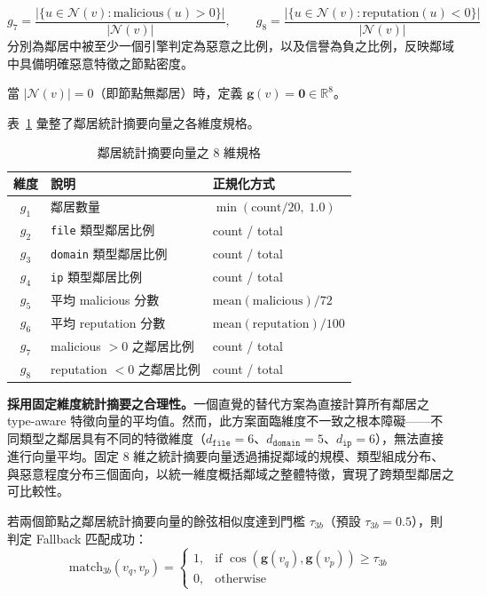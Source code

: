 \begin{ZhChapter}
\begin{equation}
    g_7 = \frac{|\{u \in \mathcal{N}(v) : \text{malicious}(u) > 0\}|}{|\mathcal{N}(v)|}, \qquad g_8 = \frac{|\{u \in \mathcal{N}(v) : \text{reputation}(u) < 0\}|}{|\mathcal{N}(v)|}
    \label{eq:g78}
\end{equation}
分別為鄰居中被至少一個引擎判定為惡意之比例，以及信譽為負之比例，反映鄰域中具備明確惡意特徵之節點密度。

當 $|\mathcal{N}(v)| = 0$（即節點無鄰居）時，定義 $\mathbf{g}(v) = \mathbf{0} \in \mathbb{R}^{8}$。

表~\ref{tab:neighbor-summary} 彙整了鄰居統計摘要向量之各維度規格。

\begin{table}[htbp]
    \centering
    \caption{鄰居統計摘要向量之 8 維規格}
    \label{tab:neighbor-summary}
    \renewcommand\arraystretch{1.2}
    \begin{tabular}{c l l}
        \hline
        \textbf{維度} & \textbf{說明} & \textbf{正規化方式} \\
        \hline
        $g_1$ & 鄰居數量 & $\min(\text{count}/20,\; 1.0)$ \\
        $g_2$ & \texttt{file} 類型鄰居比例 & count / total \\
        $g_3$ & \texttt{domain} 類型鄰居比例 & count / total \\
        $g_4$ & \texttt{ip} 類型鄰居比例 & count / total \\
        $g_5$ & 平均 malicious 分數 & $\text{mean}(\text{malicious}) / 72$ \\
        $g_6$ & 平均 reputation 分數 & $\text{mean}(\text{reputation}) / 100$ \\
        $g_7$ & malicious $> 0$ 之鄰居比例 & count / total \\
        $g_8$ & reputation $< 0$ 之鄰居比例 & count / total \\
        \hline
    \end{tabular}
\end{table}

\textbf{採用固定維度統計摘要之合理性。}一個直覺的替代方案為直接計算所有鄰居之 type-aware 特徵向量的平均值。然而，此方案面臨維度不一致之根本障礙——不同類型之鄰居具有不同的特徵維度（$d_{\texttt{file}} = 6$、$d_{\texttt{domain}} = 5$、$d_{\texttt{ip}} = 6$），無法直接進行向量平均。固定 8 維之統計摘要向量透過捕捉鄰域的規模、類型組成分布、與惡意程度分布三個面向，以統一維度概括鄰域之整體特徵，實現了跨類型鄰居之可比較性。

若兩個節點之鄰居統計摘要向量的餘弦相似度達到門檻 $\tau_{3b}$（預設 $\tau_{3b} = 0.5$），則判定 Fallback 匹配成功：
\begin{equation}
    \text{match}_{3b}(v_q, v_p) = \begin{cases} 1, & \text{if } \cos(\mathbf{g}(v_q), \mathbf{g}(v_p)) \geq \tau_{3b} \\ 0, & \text{otherwise} \end{cases}
    \label{eq:l3-fallback}
\end{equation}



\end{ZhChapter}
